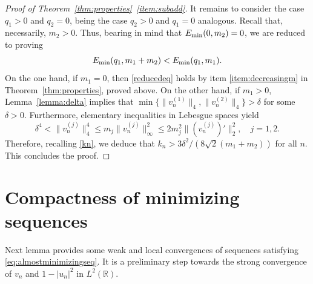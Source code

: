 \documentclass[11pt]{article}
\newcommand{\R}{\mathbb{R}}
\newcommand{\Emin}{E_\textup{min}}
\theoremstyle{plain}
\theoremstyle{definition}
\theoremstyle{remark}
\numberwithin{equation}{section}
\begin{document}
{\begin{proof}[Proof of Theorem~\ref{thm:properties}~\ref{item:subadd}]
    It remains to consider the case $q_1>0$ and $q_2=0$, being the case $q_2>0$ and $q_1=0$ analogous. Recall that, necessarily, $m_2>0$. Thus, bearing in mind that $\Emin(0,m_2)=0$, we are reduced to proving 
    \begin{equation}\label{reducedeq}
        \Emin(q_1,m_1+m_2)<\Emin(q_1,m_1).
    \end{equation}
    On the one hand, if $m_1=0$, then \eqref{reducedeq} holds by item \ref{item:decreasingm} in Theorem~\ref{thm:properties}, proved above. On the other hand, if $m_1>0$, Lemma~\ref{lemma:delta} implies that $\min\{\|v_n^{(1)}\|_4,\|v_n^{(2)}\|_4\}>\delta$ for some $\delta>0$. Furthermore, elementary inequalities in Lebesgue spaces yield 
    \[\delta^4<\|v_n^{(j)}\|_4^4\leq m_j\|v_n^{(j)}\|_\infty^2\leq 2m_j^2\|(v_n^{(j)})'\|_2^2,\quad j=1,2.\]
    Therefore, recalling \eqref{kn}, we deduce that $k_n>3\delta^2/({8}\sqrt{2}(m_1+m_2))$ for all $n$. This concludes the proof.
\end{proof}




\section{Compactness of minimizing sequences}\label{sec:compactness}

Next lemma provides some weak and local convergences of sequences satisfying \eqref{eq:almostminimizingseq}. It is a preliminary step towards the strong convergence of $v_n$ and $1-|u_n|^2$ in $L^2(\R)$.

}
\end{document}
